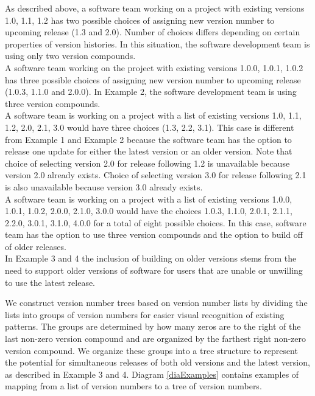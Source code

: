\documentclass[conference]{IEEEtran}
\begin{document}

 As described above, a software team working on a project with existing versions 1.0, 1.1, 1.2 has two possible choices of assigning new version number to upcoming release (1.3 and 2.0). Number of choices differs depending on certain properties of version histories. In this situation, the software development team is using only two version compounds. \\

 A software team working on the project with existing versions 1.0.0, 1.0.1, 1.0.2 has three possible choices of assigning new version number to upcoming release (1.0.3, 1.1.0 and 2.0.0). In Example 2, the software development team is using three version compounds. \\


 A software team  is working on a project with a list of existing versions 1.0, 1.1, 1.2, 2.0, 2.1, 3.0 would have three choices (1.3, 2.2, 3.1). This case is different from Example 1 and Example 2 because the software team has the option to release one update for either the latest version or an older version.  Note that choice of selecting version 2.0 for release following 1.2 is unavailable because version 2.0 already exists. Choice of selecting version 3.0 for release following 2.1 is also unavailable because version 3.0 already exists. \\

  A software team  is working on a project with a list of existing versions 1.0.0, 1.0.1, 1.0.2, 2.0.0, 2.1.0, 3.0.0 would have the choices 1.0.3, 1.1.0, 2.0.1, 2.1.1, 2.2.0, 3.0.1, 3.1.0, 4.0.0 for a total of eight possible choices. In this case, software team has the option to use  three version compounds and the option to build off of older releases. \\

In Example 3 and 4 the inclusion of building on older versions stems from the need to support older versions of software for users that are unable or unwilling to use the latest release.

We construct version number trees based on version number lists by dividing the lists into groups of version numbers for easier visual recognition of existing patterns. 
The groups are determined by how many zeros are to the right of the last non-zero version compound and are organized by the farthest right non-zero version compound. 
We organize these groups into a tree structure to represent the potential for simultaneous releases of both old versions and the latest version, as described in Example 3 and 4. Diagram \ref{diaExamples} contains examples of mapping from a list of version numbers to a tree of version numbers.
\end{document}
